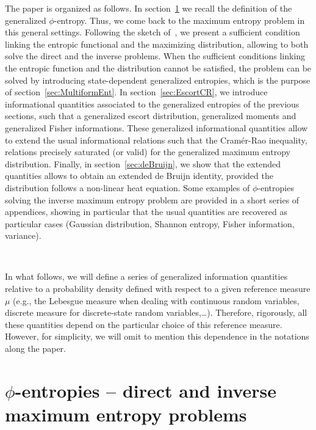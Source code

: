 \documentclass[entropy,article,submit,moreauthors,pdftex]{Definitions/mdpi}
\begin{document}
The paper is organized as  follows. In section~\ref{sec:MaxPhiEnt} we recall the
definition of the generalized $\phi$-entropy.  Thus, we come back to the maximum
entropy   problem   in   this    general   settings.    Following   the   sketch
of~\cite{KesKap89},  we  present a  sufficient  condition  linking the  entropic
functional and  the maximizing distribution,  allowing to both solve  the direct
and the inverse  problems.  When the sufficient conditions  linking the entropic
function and the distribution cannot be  satisfied, the problem can be solved by
introducing  state-dependent  generalized entropies,  which  is  the purpose  of
section~\ref{sec:MultiformEnt}.   In  section~\ref{sec:EscortCR},  we  introduce
informational quantities associated to the generalized entropies of the previous
sections, such that  a generalized escort distribution,  generalized moments and
generalized  Fisher informations.   These  generalized informational  quantities
allow to  extend the  usual informational relations  such that  the Cram\'er-Rao
inequality, relations precisely saturated (or valid) for the generalized maximum
entropy distribution.  Finally, in  section~\ref{sec:deBruijn}, we show that the
extended quantities  allows to obtain  an extended de Bruijn  identity, provided
the  distribution  follows  a  non-linear   heat  equation.   Some  examples  of
$\phi$-entropies solving the  inverse maximum entropy problem are  provided in a
short series of appendices, showing in  particular that the usual quantities are
recovered as  particular cases  (Gaussian distribution, Shannon  entropy, Fisher
information, variance).

\

In what follows,  we will define a series of  generalized information quantities
relative to  a probability  density defined  with respect  to a  given reference
measure $\mu$  (e.g., the Lebesgue  measure when dealing with  continuous random
variables,  discrete   measure  for  discrete-state   random  variables,\ldots).
Therefore, rigorously, all  these quantities depend on the  particular choice of
this reference  measure. However, for simplicity,  we will omit to  mention this
dependence in the notations along the paper.




\section{$\phi$-entropies -- direct and inverse maximum entropy problems}
\label{sec:MaxPhiEnt}
\end{document}
